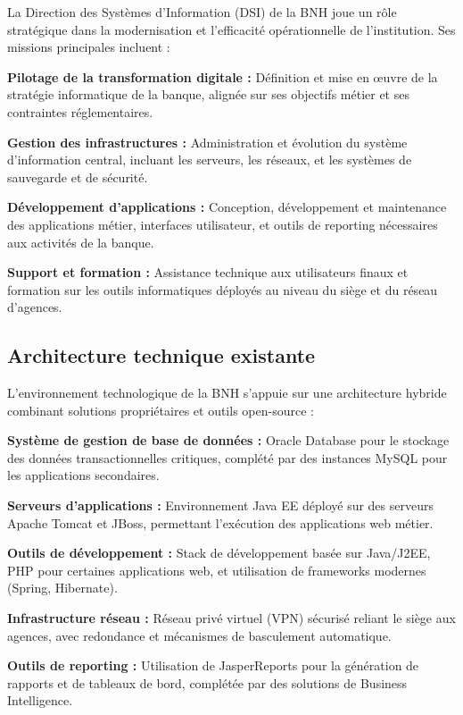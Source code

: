 La Direction des Systèmes d'Information (DSI) de la BNH joue un rôle stratégique dans la modernisation et l'efficacité opérationnelle de l'institution. Ses missions principales incluent :

\medskip

\textbf{Pilotage de la transformation digitale :} Définition et mise en œuvre de la stratégie informatique de la banque, alignée sur ses objectifs métier et ses contraintes réglementaires.

\textbf{Gestion des infrastructures :} Administration et évolution du système d'information central, incluant les serveurs, les réseaux, et les systèmes de sauvegarde et de sécurité.

\textbf{Développement d'applications :} Conception, développement et maintenance des applications métier, interfaces utilisateur, et outils de reporting nécessaires aux activités de la banque.

\textbf{Support et formation :} Assistance technique aux utilisateurs finaux et formation sur les outils informatiques déployés au niveau du siège et du réseau d'agences.

\subsection{Architecture technique existante}

L'environnement technologique de la BNH s'appuie sur une architecture hybride combinant solutions propriétaires et outils open-source :

\medskip

\textbf{Système de gestion de base de données :} Oracle Database pour le stockage des données transactionnelles critiques, complété par des instances MySQL pour les applications secondaires.

\textbf{Serveurs d'applications :} Environnement Java EE déployé sur des serveurs Apache Tomcat et JBoss, permettant l'exécution des applications web métier.

\textbf{Outils de développement :} Stack de développement basée sur Java/J2EE, PHP pour certaines applications web, et utilisation de frameworks modernes (Spring, Hibernate).

\textbf{Infrastructure réseau :} Réseau privé virtuel (VPN) sécurisé reliant le siège aux agences, avec redondance et mécanismes de basculement automatique.

\textbf{Outils de reporting :} Utilisation de JasperReports pour la génération de rapports et de tableaux de bord, complétée par des solutions de Business Intelligence.

